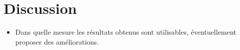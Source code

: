 \section{Discussion}

\begin{itemize}
\item Dans quelle mesure les résultats obtenus sont utilisables, éventuellement proposer des améliorations.
\end{itemize}